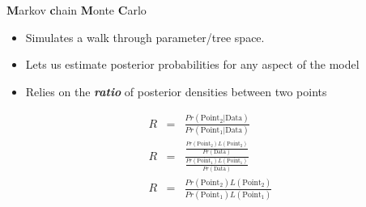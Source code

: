 \documentclass{seminar}
\begin{document}
\begin{slide}
\begin{center}
\newslide
\Large {\bf M}arkov {\bf c}hain {\bf M}onte {\bf C}arlo
\begin{itemize}
	\item Simulates a walk through parameter/tree space.
	\item Lets us estimate posterior probabilities for any aspect of the model
	\item Relies on the {\bf \em ratio} of posterior densities between two points
\end{itemize}
\newslide
\Large
\begin{eqnarray*}
R & = & \frac{Pr(\mbox{Point}_2|\mbox{Data})}{Pr(\mbox{Point}_1|\mbox{Data})} \\[15pt]
R & = & \frac{\frac{Pr\left(\mbox{Point}_2\right)L\left(\mbox{Point}_2\right)}{Pr\left(\mbox{Data}\right)}}{\frac{Pr\left(\mbox{Point}_1\right)L\left(\mbox{Point}_1\right)}{Pr\left(\mbox{Data}\right)}}\\[15pt]
R & = & \frac {Pr\left(\mbox{Point}_2\right)L\left(\mbox{Point}_2\right)}{Pr\left(\mbox{Point}_1\right)L\left(\mbox{Point}_1\right)}\\[15pt]
\end{eqnarray*}
%


\end{center}

\end{slide}
\end{document}
